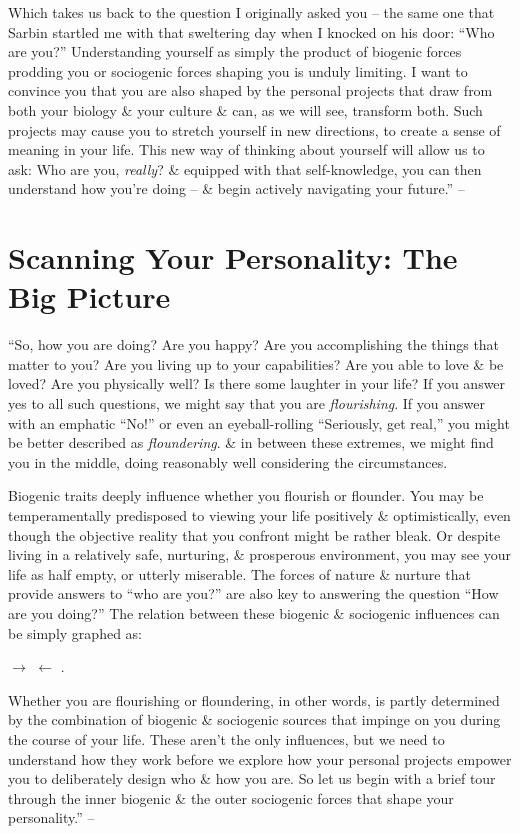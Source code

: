 \documentclass{article}
\numberwithin{equation}{section}
\begin{document}
Which takes us back to the question I originally asked you -- the same one that Sarbin startled me with that sweltering day when I knocked on his door: ``Who are you?'' Understanding yourself as simply the product of biogenic forces prodding you or sociogenic forces shaping you is unduly limiting. I want to convince you that you are also shaped by the personal projects that draw from both your biology \& your culture \& can, as we will see, transform both. Such projects may cause you to stretch yourself in new directions, to create a sense of meaning in your life. This new way of thinking about yourself will allow us to ask: Who are you, \textit{really}? \& equipped with that self-knowledge, you can then understand how you're doing -- \& begin actively navigating your future.'' -- \cite[pp. 6--11]{Little2017}


\section{Scanning Your Personality: The Big Picture}
``So, how you are doing? Are you happy? Are you accomplishing the things that matter to you? Are you living up to your capabilities? Are you able to love \& be loved? Are you physically well? Is there some laughter in your life? If you answer yes to all such questions, we might say that you are \textit{flourishing}. If you answer with an emphatic ``No!'' or even an eyeball-rolling ``Seriously, get real,'' you might be better described as \textit{floundering}. \& in between these extremes, we might find you in the middle, doing reasonably well considering the circumstances.

Biogenic traits deeply influence whether you flourish or flounder. You may be temperamentally predisposed to viewing your life positively \& optimistically, even though the objective reality that you confront might be rather bleak. Or despite living in a relatively safe, nurturing, \& prosperous environment, you may see your life as half empty, or utterly miserable. The forces of nature \& nurture that provide answers to ``who are you?'' are also key to answering the question ``How are you doing?'' The relation between these biogenic \& sociogenic influences can be simply graphed as:
\begin{center}
	 $\to$  $\leftarrow$ .
\end{center}
Whether you are flourishing or floundering, in other words, is partly determined by the combination of biogenic \& sociogenic sources that impinge on you during the course of your life. These aren't the only influences, but we need to understand how they work before we explore how your personal projects empower you to deliberately design who \& how you are. So let us begin with a brief tour through the inner biogenic \& the outer sociogenic forces that shape your personality.'' -- \cite[p. 12]{Little2017}
\end{document}
